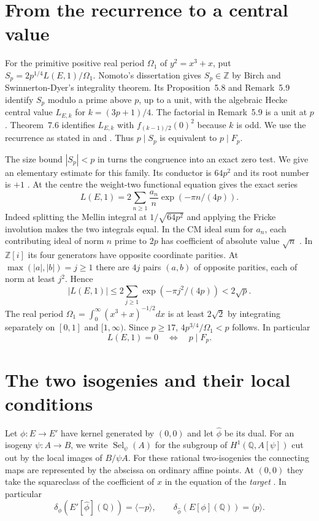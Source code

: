 \documentclass[11pt]{article}
\newcommand{\Q}{\mathbb Q}\newcommand{\Z}{\mathbb Z}\newcommand{\F}{\mathbb F}
\DeclareMathOperator{\Sel}{Sel}\DeclareMathOperator{\Br}{Br}
\begin{document}
\section{From the recurrence to a central value}
For the primitive positive real period $\Omega_1$ of $y^2=x^3+x$, put $S_p=2p^{1/4}L(E,1)/\Omega_1$. Nomoto's dissertation \cite[\S5.2]{thesis} gives $S_p\in\Z$ by Birch and Swinnerton-Dyer's integrality theorem. Its Proposition~5.8 and Remark~5.9 identify $S_p$ modulo a prime above $p$, up to a unit, with the algebraic Hecke central value $L_{E,k}$ for $k=(3p+1)/4$. The factorial in Remark~5.9 is a unit at $p$. Theorem~7.6 identifies $L_{E,k}$ with $f_{(k-1)/2}(0)^2$ because $k$ is odd. We use the recurrence as stated in \cite[Thm.~1.1]{nom} and \cite[Thm.~4.2]{thesis}. Thus $p\mid S_p$ is equivalent to $p\mid F_p$.

The size bound $|S_p|<p$ in \cite[Prop.~5.6]{thesis} turns the congruence into an exact zero test. We give an elementary estimate for this family. Its conductor is $64p^2$ and its root number is $+1$ \cite[\S4--5]{thesis}. At the centre the weight-two functional equation gives the exact series
\[
 L(E,1)=2\sum_{n\ge1}\frac{a_n}{n}\exp(-\pi n/(4p)).
\]
Indeed splitting the Mellin integral at $1/\sqrt{64p^2}$ and applying the Fricke involution makes the two integrals equal. In the CM ideal sum for $a_n$, each contributing ideal of norm $n$ prime to $2p$ has coefficient of absolute value $\sqrt n$ \cite[\S5.2]{thesis}. In $\Z[i]$ its four generators have opposite coordinate parities. At $\max(|a|,|b|)=j\ge1$ there are $4j$ pairs $(a,b)$ of opposite parities, each of norm at least $j^2$. Hence
\[
 |L(E,1)|\le 2\sum_{j\ge1}\exp(-\pi j^2/(4p))<2\sqrt p .
\]
The real period $\Omega_1=\int_0^\infty (x^3+x)^{-1/2}dx$ is at least $2\sqrt2$ by integrating separately on $[0,1]$ and $[1,\infty)$. Since $p\ge17$, $4p^{3/4}/\Omega_1<p$ follows. In particular
\begin{equation}\label{test} L(E,1)=0\quad\Longleftrightarrow\quad p\mid F_p .\end{equation}

\section{The two isogenies and their local conditions}
Let $\phi:E\to E'$ have kernel generated by $(0,0)$ and let $\widehat\phi$ be its dual. For an isogeny $\psi:A\to B$, we write $\Sel_\psi(A)$ for the subgroup of $H^1(\Q,A[\psi])$ cut out by the local images of $B/\psi A$. For these rational two-isogenies the connecting maps are represented by the abscissa on ordinary affine points. At $(0,0)$ they take the squareclass of the coefficient of $x$ in the equation of the \emph{target} \cite[X.4.9]{sil}. In particular
\[
 \delta_\phi(E'[\widehat\phi](\Q))=\langle-p\rangle,\qquad
 \delta_{\widehat\phi}(E[\phi](\Q))=\langle p\rangle.
\]
\end{document}
